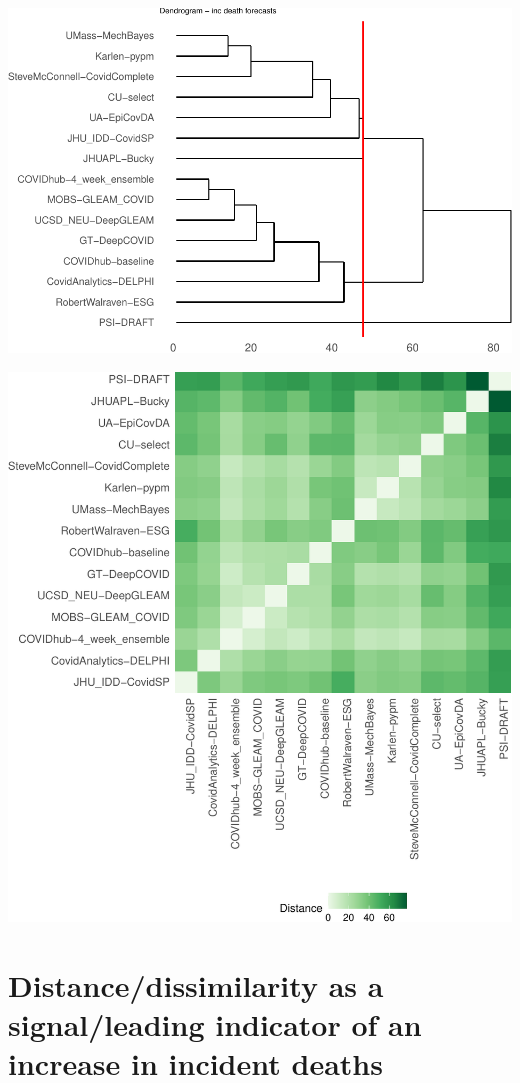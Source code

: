 \documentclass[
]{article}
\begin{document}
\includegraphics{sim_analysis_5_files/figure-latex/dendro-1.pdf}

\includegraphics{sim_analysis_5_files/figure-latex/unnamed-chunk-3-1.pdf}

\hypertarget{distancedissimilarity-as-a-signalleading-indicator-of-an-increase-in-incident-deaths}{%
\section{Distance/dissimilarity as a signal/leading indicator of an
increase in incident
deaths}\label{distancedissimilarity-as-a-signalleading-indicator-of-an-increase-in-incident-deaths}}
\end{document}
